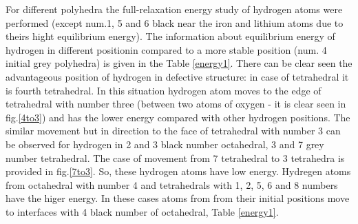  For different polyhedra the full-relaxation energy study of hydrogen atoms were performed (except num.1, 5 and 6 black near the iron and lithium atoms due to theirs hight equilibrium energy). The information about equilibrium energy of hydrogen in different positionin compared to a more stable position (num. 4 initial grey polyhedra) is given in the Table \ref{energy1}. There can be clear seen the advantageous position of hydrogen in defective structure: in case of tetrahedral it is fourth tetrahedral. In this situation hydrogen atom moves to the edge of tetrahedral with number three (between two atoms of oxygen - it is clear seen in fig.\ref{4to3}) and has the lower energy compared with other hydrogen positions. The similar movement but in direction to the face of tetrahedral with number 3 can be observed for hydrogen in 2 and 3 black number octahedral, 3 and 7 grey number tetrahedral. The case of movement from 7 tetrahedral to 3 tetrahedra is provided in fig.\ref{7to3}.  So, these hydrogen atoms have low energy. Hydregen atoms from octahedral with number 4 and tetrahedrals with 1, 2, 5, 6 and 8 numbers have the higer energy. In these cases atoms from from their initial positions move to interfaces with 4 black number of octahedral, Table \ref{energy1}.

